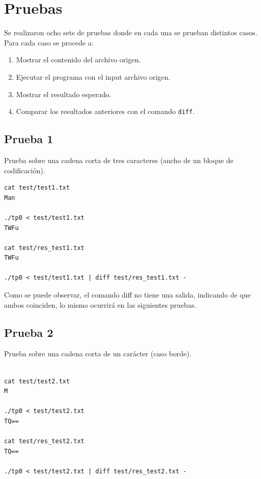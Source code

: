 \documentclass[titlepage,a4paper]{article}
\begin{document}
\section{Pruebas}
Se realizaron ocho sets de pruebas donde en cada una se prueban distintos casos. Para cada caso se procede a:
\begin{enumerate}
    \item Mostrar el contenido del archivo origen.
    \item Ejecutar el programa con el input archivo origen.
    \item Mostrar el resultado esperado.
    \item Comparar los resultados anteriores con el comando \verb|diff|.
\end{enumerate}
\subsection{Prueba 1}
Prueba sobre una cadena corta de tres caracteres (ancho de un bloque de codificación).

\begin{lstlisting}[style=test_run_style]
cat test/test1.txt
Man

./tp0 < test/test1.txt
TWFu

cat test/res_test1.txt
TWFu

./tp0 < test/test1.txt | diff test/res_test1.txt -

\end{lstlisting}
Como se puede observar, el comando diff no tiene una salida, indicando de que ambos coinciden, lo mismo ocurrirá en las siguientes pruebas.

\subsection{Prueba 2}
Prueba sobre una cadena corta de un carácter (caso borde).
\begin{lstlisting}[style=test_run_style]

cat test/test2.txt
M

./tp0 < test/test2.txt
TQ==

cat test/res_test2.txt
TQ==

./tp0 < test/test2.txt | diff test/res_test2.txt -

\end{lstlisting}
\end{document}
